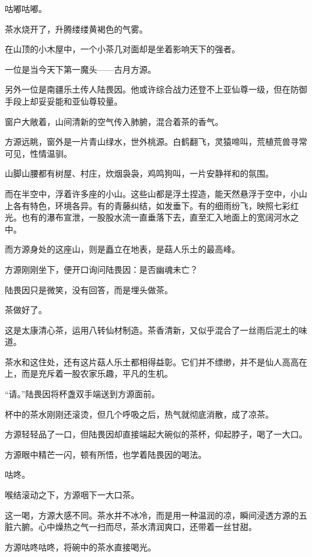 
\begin{this_body}

咕嘟咕嘟。

茶水烧开了，升腾缕缕黄褐色的气雾。

在山顶的小木屋中，一个小茶几对面却是坐着影响天下的强者。

一位是当今天下第一魔头——古月方源。

另外一位是南疆乐土传人陆畏因。他或许综合战力还登不上亚仙尊一级，但在防御手段上却妥妥能和亚仙尊较量。

窗户大敞着，山间清新的空气传入肺腑，混合着茶的香气。

方源远眺，窗外是一片青山绿水，世外桃源。白鹤翻飞，灵猿啼叫，荒植荒兽寻常可见，性情温驯。

山脚山腰都有树屋、村庄，炊烟袅袅，鸡鸣狗叫，一片安静祥和的氛围。

而在半空中，浮着许多座的小山。这些山都是浮土捏造，能天然悬浮于空中，小山上各有特色，环境各异。有的青藤纠结，如发垂下。有的细雨纷飞，映照七彩红光。也有的瀑布宣泄，一股股水流一直垂落下去，直至汇入地面上的宽阔河水之中。

而方源身处的这座山，则是矗立在地表，是菇人乐土的最高峰。

方源刚刚坐下，便开口询问陆畏因：是否幽魂未亡？

陆畏因只是微笑，没有回答，而是埋头做茶。

茶做好了。

这是太康清心茶，运用八转仙材制造。茶香清新，又似乎混合了一丝雨后泥土的味道。

茶水和这住处，还有这片菇人乐土都相得益彰。它们并不缥缈，并不是仙人高高在上，而是充斥着一股农家乐趣，平凡的生机。

“请。”陆畏因将杯盏双手端送到方源面前。

杯中的茶水刚刚还滚烫，但几个呼吸之后，热气就彻底消散，成了凉茶。

方源轻轻品了一口，但陆畏因却直接端起大碗似的茶杯，仰起脖子，喝了一大口。

方源眼中精芒一闪，顿有所悟，也学着陆畏因的喝法。

咕咚。

喉结滚动之下，方源咽下一大口茶。

这一喝，方源大感不同。茶水并不冰冷，而是用一种温润的凉，瞬间浸透方源的五脏六腑。心中燥热之气一扫而尽，茶水清润爽口，还带着一丝甘甜。

方源咕咚咕咚，将碗中的茶水直接喝光。


\end{this_body}
